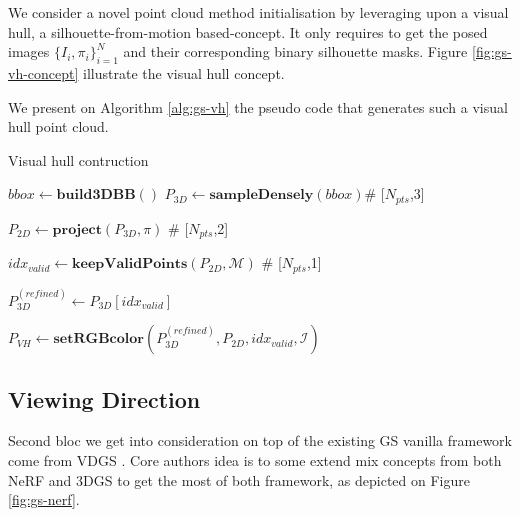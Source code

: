 We consider a novel point cloud method initialisation by leveraging upon a visual hull, a silhouette-from-motion \citep{baumgart1974geometric} based-concept. It only requires to get the posed images $\{I_{i},\pi_{i}\}_{i=1}^{N}$ and their corresponding binary silhouette masks. Figure \ref{fig:gs-vh-concept} illustrate the visual hull concept. 

We present on Algorithm \ref{alg:gs-vh} the pseudo code that generates such a visual hull point cloud. 

\begin{algorithm}[htpb!]
  \caption{Visual hull contruction}\label{alg:gs-vh}
  \medskip
  \medskip
  $bbox \gets \mathbf{build3DBB}()$ 
  $P_{3D} \gets \mathbf{sampleDensely}(bbox)$\hspace{.4cm}\textcolor{gray!80}{\# 
    [$N_{pts}$,3]} 

   $P_{2D} \gets \mathbf{project}(P_{3D},\pi)$ \hspace{.4cm}\textcolor{gray!80}{\# 
    [$N_{pts}$,2]} 
    
    $idx_{valid} \gets \mathbf{keepValidPoints}(P_{2D},\mathcal{M})$ \hspace{.4cm}\textcolor{gray!80}{\# 
    [$N_{pts}$,1]} 

    $P_{3D}^{(refined)} \gets P_{3D}[idx_{valid}]$ 

    $P_{VH} \gets \mathbf{setRGBcolor}(P_{3D}^{(refined)},P_{2D},idx_{valid},\mathcal{I})$ 
\end{algorithm}


\subsection{Viewing Direction}
Second bloc we get into consideration on top of the existing GS vanilla framework come from \ac{VDGS} \citep{malarz2023gaussian}. Core authors idea is to some extend mix concepts from both \ac{NeRF} and 3D\ac{GS} to get the most of both framework, as depicted on Figure \ref{fig:gs-nerf}. 

